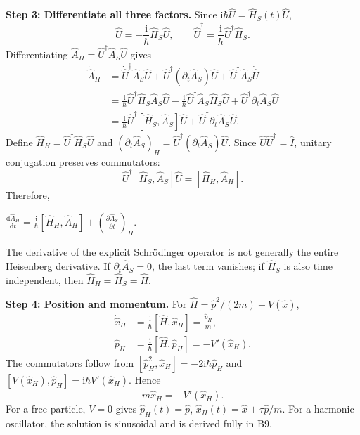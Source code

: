 \documentclass[11pt,a4paper]{article}
\newcommand{\key}[1]{\begin{resultbox}\centering\(\displaystyle #1\)\end{resultbox}}
\newcommand{\dd}{\mathrm{d}}\newcommand{\iu}{\mathrm{i}}\newcommand{\ee}{\mathrm{e}}
\begin{document}
\textbf{Step 3: Differentiate all three factors.} Since \(\iu\hbar\dot{\hat U}=\hat H_S(t)\hat U\),
\begin{equation}\dot{\hat U}=-\frac{\iu}{\hbar}\hat H_S\hat U,\qquad
\dot{\hat U}^\dagger=\frac{\iu}{\hbar}\hat U^\dagger\hat H_S.\end{equation}
Differentiating \(\hat A_H=\hat U^\dagger\hat A_S\hat U\) gives
\begin{align}
\dot{\hat A}_H&=\dot{\hat U}^\dagger\hat A_S\hat U+\hat U^\dagger(\partial_t\hat A_S)\hat U+\hat U^\dagger\hat A_S\dot{\hat U}\\
&=\frac{\iu}{\hbar}\hat U^\dagger\hat H_S\hat A_S\hat U-\frac{\iu}{\hbar}\hat U^\dagger\hat A_S\hat H_S\hat U+\hat U^\dagger\partial_t\hat A_S\hat U\\
&=\frac{\iu}{\hbar}\hat U^\dagger[\hat H_S,\hat A_S]\hat U+\hat U^\dagger\partial_t\hat A_S\hat U.
\end{align}
Define \(\hat H_H=\hat U^\dagger\hat H_S\hat U\) and \((\partial_t\hat A_S)_H=\hat U^\dagger(\partial_t\hat A_S)\hat U\). Since \(\hat U\hat U^\dagger=\hat I\), unitary conjugation preserves commutators:
\begin{equation}\hat U^\dagger[\hat H_S,\hat A_S]\hat U=[\hat H_H,\hat A_H].\end{equation}
Therefore,
\key{\boxed{\frac{\dd\hat A_H}{\dd t}=\frac{\iu}{\hbar}[\hat H_H,\hat A_H]+\left(\frac{\partial\hat A_S}{\partial t}\right)_H.}}
The derivative of the explicit Schr\"odinger operator is not generally the entire Heisenberg derivative. If \(\partial_t\hat A_S=0\), the last term vanishes; if \(\hat H_S\) is also time independent, then \(\hat H_H=\hat H_S=\hat H\).

\textbf{Step 4: Position and momentum.} For \(\hat H=\hat p^2/(2m)+V(\hat x)\),
\begin{align}
\dot{\hat x}_H&=\frac{\iu}{\hbar}[\hat H,\hat x_H]=\frac{\hat p_H}{m},\\
\dot{\hat p}_H&=\frac{\iu}{\hbar}[\hat H,\hat p_H]=-V'(\hat x_H).
\end{align}
The commutators follow from \([\hat p_H^2,\hat x_H]=-2\iu\hbar\hat p_H\) and \([V(\hat x_H),\hat p_H]=\iu\hbar V'(\hat x_H)\). Hence
\begin{equation}\boxed{m\ddot{\hat x}_H=-V'(\hat x_H).}\end{equation}
For a free particle, \(V=0\) gives \(\hat p_H(t)=\hat p\), \(\hat x_H(t)=\hat x+\tau\hat p/m\). For a harmonic oscillator, the solution is sinusoidal and is derived fully in B9.
\end{document}
